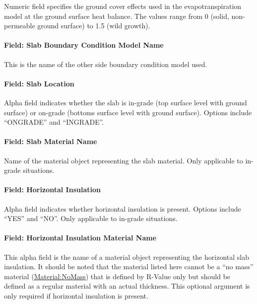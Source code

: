Numeric field specifies the ground cover effects used in the evapotranspiration model at the ground surface heat balance. The values range from 0 (solid, non-permeable ground surface) to 1.5 (wild growth).

\paragraph{Field: Slab Boundary Condition Model Name}\label{field-slab-boundary-condition-model-name}

This is the name of the other side boundary condition model used.

\paragraph{Field: Slab Location}\label{field-slab-location}

Alpha field indicates whether the slab is in-grade (top surface level with ground surface) or on-grade (bottoms surface level with ground surface). Options include ``ONGRADE'' and ``INGRADE''.

\paragraph{Field: Slab Material Name}\label{field-slab-material-name}

Name of the material object representing the slab material. Only applicable to in-grade situations.

\paragraph{Field: Horizontal Insulation}\label{field-horizontal-insulation}

Alpha field indicates whether horizontal insulation is present. Options include ``YES'' and ``NO''. Only applicable to in-grade situations.

\paragraph{Field: Horizontal Insulation Material Name}\label{field-horizontal-insulation-material-name}

This alpha field is the name of a material object representing the horizontal slab insulation. It should be noted that the material listed here cannot be a ``no mass'' material (\hyperref[materialnomass]{Material:NoMass}) that is defined by R-Value only but should be defined as a regular material with an actual thickness. This optional argument is only required if horizontal insulation is present.

